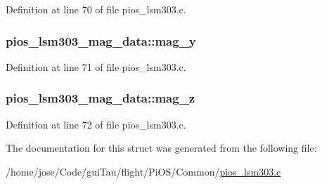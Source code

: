 Definition at line 70 of file pios\-\_\-lsm303.\-c.

\hypertarget{structpios__lsm303__mag__data_a3365812478c4eab5da066f69f10ceacf}{
\subsubsection[{mag\-\_\-y}]{ pios\-\_\-lsm303\-\_\-mag\-\_\-data\-::mag\-\_\-y}}\label{structpios__lsm303__mag__data_a3365812478c4eab5da066f69f10ceacf}


Definition at line 71 of file pios\-\_\-lsm303.\-c.

\hypertarget{structpios__lsm303__mag__data_a2989fa1111551a8ec9135c7446bb0a03}{
\subsubsection[{mag\-\_\-z}]{ pios\-\_\-lsm303\-\_\-mag\-\_\-data\-::mag\-\_\-z}}\label{structpios__lsm303__mag__data_a2989fa1111551a8ec9135c7446bb0a03}


Definition at line 72 of file pios\-\_\-lsm303.\-c.



The documentation for this struct was generated from the following file\-:\begin{DoxyCompactItemize}
\item 
/home/jose/\-Code/gui\-Tau/flight/\-Pi\-O\-S/\-Common/\hyperlink{pios__lsm303_8c}{pios\-\_\-lsm303.\-c}\end{DoxyCompactItemize}
